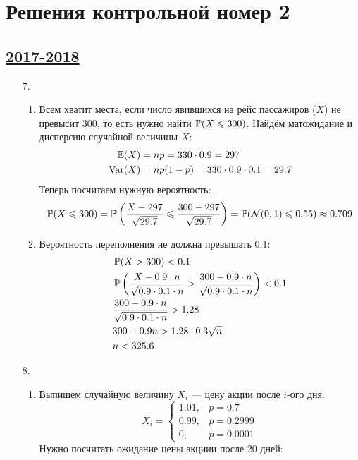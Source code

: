\thispagestyle{empty}
\section{Решения контрольной номер 2}

\subsection[2017-2018]{\hyperref[sec:kr_02_2017_2018]{2017-2018}}
\label{sec:sol_kr_02_2017_2018}

\begin{enumerate}
\item[7.]
\begin{enumerate}
\item Всем хватит места, если число явившихся на рейс пассажиров ($X$) не превысит $300$,
то есть нужно найти $\P(X \leq 300)$. Найдём матожидание и дисперсию
случайной величины $X$:
\begin{align*}
\E(X) &= np = 330 \cdot 0.9 = 297 \\
\Var(X) &= np(1-p) = 330 \cdot 0.9 \cdot 0.1 = 29.7
\end{align*}
Теперь посчитаем нужную вероятность:
\[
\P(X \leq 300) = \P \left(\frac{X - 297}{\sqrt{29.7}} \leq \frac{300 - 297}{\sqrt{29.7}} \right) = \P(\cN(0,1) \leq 0.55) \approx 0.709
\]
\item Вероятность переполнения не должна превышать $0.1$:
\begin{align*}
&\P(X > 300) < 0.1 \\
&\P\left(\frac{X - 0.9 \cdot n}{\sqrt{0.9 \cdot 0.1 \cdot n}} > \frac{300 - 0.9 \cdot n}{\sqrt{0.9 \cdot 0.1 \cdot n}} \right) < 0.1 \\
&\frac{300 - 0.9 \cdot n}{\sqrt{0.9 \cdot 0.1 \cdot n}}  > 1.28 \\
&300 - 0.9n > 1.28 \cdot 0.3 \sqrt{n} \\
&n < 325.6
\end{align*}
\end{enumerate}
\item[8.]
\begin{enumerate}
\item Выпишем случайную величину $X_i$ — цену акции после $i$-ого дня:
\[
X_i =
\begin{cases}
1.01, & p = 0.7 \\
0.99, & p = 0.2999 \\
0, & p = 0.0001
\end{cases}
\]
Нужно посчитать ожидание цены акциии после 20 дней:

\end{enumerate}
\end{enumerate}
